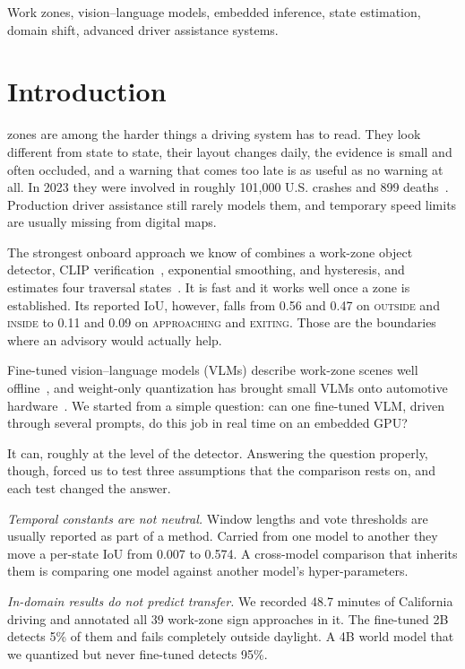 \documentclass[journal]{IEEEtran}
\newcommand{\st}[1]{\textsc{#1}}
\begin{document}
\begin{IEEEkeywords}
Work zones, vision--language models, embedded inference, state estimation, domain shift, advanced driver assistance systems.
\end{IEEEkeywords}

\section{Introduction}
\label{sec:intro}

 zones are among the harder things a driving system has to read.  They look different from state to state, their layout changes daily, the evidence is small and often occluded, and a warning that comes too late is as useful as no warning at all.  In 2023 they were involved in roughly 101{,}000 U.S. crashes and 899 deaths~\cite{nhtsa2023}.  Production driver assistance still rarely models them, and temporary speed limits are usually missing from digital maps.

The strongest onboard approach we know of combines a work-zone object detector, CLIP verification~\cite{radford2021clip}, exponential smoothing, and hysteresis, and estimates four traversal states~\cite{priorsystem2026}.  It is fast and it works well once a zone is established.  Its reported IoU, however, falls from 0.56 and 0.47 on \st{outside} and \st{inside} to 0.11 and 0.09 on \st{approaching} and \st{exiting}.  Those are the boundaries where an advisory would actually help.

Fine-tuned vision--language models (VLMs) describe work-zone scenes well offline~\cite{ghosh2025roadwork}, and weight-only quantization has brought small VLMs onto automotive hardware~\cite{lin2024awq,trtedgellm}.  We started from a simple question: can one fine-tuned VLM, driven through several prompts, do this job in real time on an embedded GPU?

It can, roughly at the level of the detector.  Answering the question properly, though, forced us to test three assumptions that the comparison rests on, and each test changed the answer.

\emph{Temporal constants are not neutral.}  Window lengths and vote thresholds are usually reported as part of a method.  Carried from one model to another they move a per-state IoU from 0.007 to 0.574.  A cross-model comparison that inherits them is comparing one model against another model's hyper-parameters.

\emph{In-domain results do not predict transfer.}  We recorded 48.7 minutes of California driving and annotated all 39 work-zone sign approaches in it.  The fine-tuned 2B detects 5\% of them and fails completely outside daylight.  A 4B world model that we quantized but never fine-tuned detects 95\%.
\end{document}
